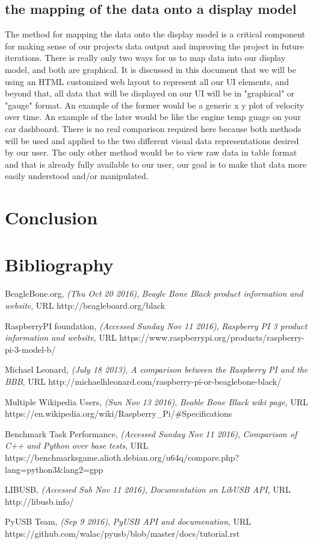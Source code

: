 \documentclass[10pt,draftclsnofoot,onecolumn]{IEEEtran}
\begin{document}
\subsection{the mapping of the data onto a display model}
The method for mapping the data onto the display model is a critical component for making sense of our projects data output and improving the project in future iterations. There is really only two ways for us to map data into our display model, and both are graphical. It is discussed in this document that we will be using an HTML customized web layout to represent all our UI elements, and beyond that, all data that will be displayed on our UI will be in "graphical" or "gauge" format. An example of the former would be a generic x y plot of velocity over time. An example of the later would be like the engine temp guage on your car dashboard. There is no real comparison required here because both methods will be used and applied to the two different visual data representations desired by our user. The only other method would be to view raw data in table format and that is already fully available to our user, our goal is to make that data more easily understood and/or manipulated.

\section{Conclusion}
\section{Bibliography}
\begin{thebibliography}{9}

 BeagleBone.org,
\emph{(Thu Oct 20 2016)},
  \emph{Beagle Bone Black product information and website},
URL  http://beagleboard.org/black

RaspberryPI foundation,
\emph{(Accessed Sunday  Nov 11 2016)},
  \emph{Raspberry PI 3 product information and website},
URL https://www.raspberrypi.org/products/raspberry-pi-3-model-b/

Michael Leonard,
\emph{(July 18 2013)},
  \emph{A comparison between the Raspberry PI and the BBB},
URL  http://michaelhleonard.com/raspberry-pi-or-beaglebone-black/ 

Multiple Wikipedia Users,
\emph{(Sun Nov 13 2016)},
  \emph{Beable Bone Black wiki page},
URL https://en.wikipedia.org/wiki/Raspberry\_Pi/\#Specifications 

 Benchmark Task Performance,
\emph{(Accessed Sunday  Nov 11 2016)},
 \emph{Comparison of C++ and Python over base tests},
URL   https://benchmarksgame.alioth.debian.org/u64q/compare.php?lang=python3\&lang2=gpp  

LIBUSB,
\emph{(Accessed Sub Nov 11 2016)},
  \emph{Documentation on LibUSB API},
URL http://libusb.info/

PyUSB Team,
\emph{(Sep 9 2016)},
  \emph{PyUSB API and documenation},
URL https://github.com/walac/pyusb/blob/master/docs/tutorial.rst

\end{thebibliography}
\end{document}
